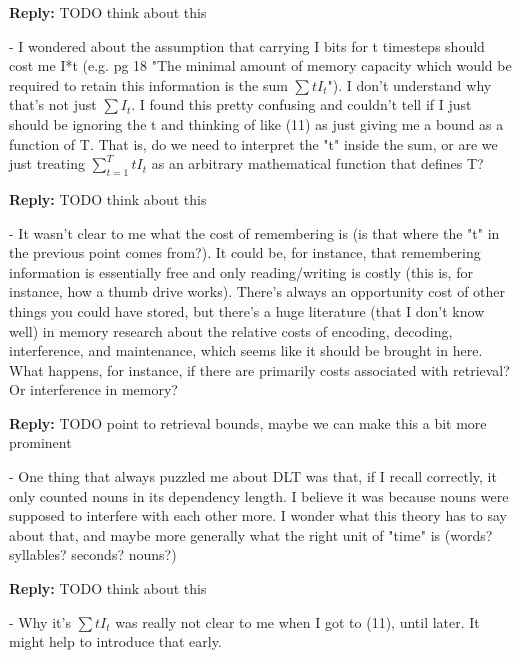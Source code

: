 \documentclass{article}[11pt,a4paper,oneside]
\newenvironment{reply}
  {\par\medskip
   \color{blue}%
   \begin{framed}
   \textbf{Reply: }\ignorespaces}
 {\end{framed}
  \medskip}
\begin{document}
\begin{reply}
	TODO think about this
\end{reply}

- I wondered about the assumption that carrying I bits for t timesteps should cost me I*t (e.g. pg 18 "The minimal amount of memory capacity which would be required to retain this information is the sum $\sum t I_t$"). I don't understand why that's not just $\sum I_t$. I found this pretty confusing and couldn't tell if I just should be ignoring the t and thinking of like (11) as just giving me a bound as a function of T. That is, do we need to interpret the "t" inside the sum, or are we just treating $\sum_{t=1}^T t I_t$ as an arbitrary mathematical function that defines T?

\begin{reply}
	TODO think about this
\end{reply}

- It wasn't clear to me what the cost of remembering is (is that where the "t" in the previous point comes from?). It could be, for instance, that remembering information is essentially free and only reading/writing is costly (this is, for instance, how a thumb drive works). There's always an opportunity cost of other things you could have stored, but there's a huge literature (that I don't know well) in memory research about the relative costs of encoding, decoding, interference, and maintenance, which seems like it should be brought in here. What happens, for instance, if there are primarily costs associated with retrieval? Or interference in memory?

\begin{reply}
	TODO point to retrieval bounds, maybe we can make this a bit more prominent
\end{reply}

- One thing that always puzzled me about DLT was that, if I recall correctly, it only counted nouns in its dependency length. I believe it was because nouns were supposed to interfere with each other more. I wonder what this theory has to say about that, and maybe more generally what the right unit of "time" is (words? syllables? seconds? nouns?)

\begin{reply}
	TODO think about this
\end{reply}

- Why it's $\sum t I_t$ was really not clear to me when I got to (11), until later. It might help to introduce that early.
\end{document}
